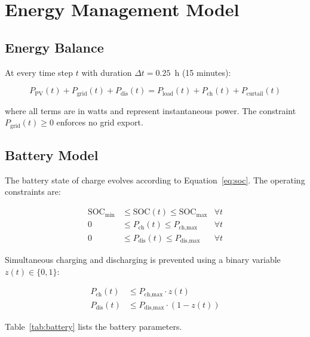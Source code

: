 \chapter{Energy Management Model}
\label{ch:energy}

\section{Energy Balance}

At every time step $t$ with duration $\Delta t = 0.25$~h (15 minutes):

\begin{equation}
    P_{\text{PV}}(t) + P_{\text{grid}}(t) + P_{\text{dis}}(t) = P_{\text{load}}(t) + P_{\text{ch}}(t) + P_{\text{curtail}}(t)
    \label{eq:balance}
\end{equation}

where all terms are in watts and represent instantaneous power. The constraint $P_{\text{grid}}(t) \geq 0$ enforces no grid export.

\section{Battery Model}

The battery state of charge evolves according to Equation~\ref{eq:soc}. The operating constraints are:

\begin{align}
    \text{SOC}_{\min} &\leq \text{SOC}(t) \leq \text{SOC}_{\max} & \forall t \label{eq:soc_bounds} \\
    0 &\leq P_{\text{ch}}(t) \leq P_{\text{ch,max}} & \forall t \label{eq:ch_limit} \\
    0 &\leq P_{\text{dis}}(t) \leq P_{\text{dis,max}} & \forall t \label{eq:dis_limit}
\end{align}

Simultaneous charging and discharging is prevented using a binary variable $z(t) \in \{0, 1\}$:

\begin{align}
    P_{\text{ch}}(t) &\leq P_{\text{ch,max}} \cdot z(t) \\
    P_{\text{dis}}(t) &\leq P_{\text{dis,max}} \cdot (1 - z(t))
\end{align}

Table~\ref{tab:battery} lists the battery parameters.

